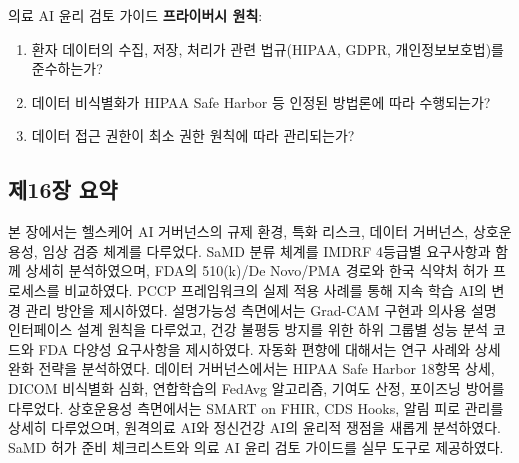 \begin{practicaltool}{의료 AI 윤리 검토 가이드}
\textbf{프라이버시 원칙}:
\begin{enumerate}
 \item 환자 데이터의 수집, 저장, 처리가 관련 법규(HIPAA, GDPR, 개인정보보호법)를 준수하는가?
 \item 데이터 비식별화가 HIPAA Safe Harbor 등 인정된 방법론에 따라 수행되는가?
 \item 데이터 접근 권한이 최소 권한 원칙에 따라 관리되는가?
\end{enumerate}
\end{practicaltool}

\subsection*{제16장 요약}

본 장에서는 헬스케어 AI 거버넌스의 규제 환경, 특화 리스크, 데이터 거버넌스, 상호운용성, 임상 검증 체계를 다루었다. SaMD 분류 체계를 IMDRF 4등급별 요구사항과 함께 상세히 분석하였으며, FDA의 510(k)/De Novo/PMA 경로와 한국 식약처 허가 프로세스를 비교하였다. PCCP 프레임워크의 실제 적용 사례를 통해 지속 학습 AI의 변경 관리 방안을 제시하였다. 설명가능성 측면에서는 Grad-CAM 구현과 의사용 설명 인터페이스 설계 원칙을 다루었고, 건강 불평등 방지를 위한 하위 그룹별 성능 분석 코드와 FDA 다양성 요구사항을 제시하였다. 자동화 편향에 대해서는 연구 사례와 상세 완화 전략을 분석하였다. 데이터 거버넌스에서는 HIPAA Safe Harbor 18항목 상세, DICOM 비식별화 심화, 연합학습의 FedAvg 알고리즘, 기여도 산정, 포이즈닝 방어를 다루었다. 상호운용성 측면에서는 SMART on FHIR, CDS Hooks, 알림 피로 관리를 상세히 다루었으며, 원격의료 AI와 정신건강 AI의 윤리적 쟁점을 새롭게 분석하였다. SaMD 허가 준비 체크리스트와 의료 AI 윤리 검토 가이드를 실무 도구로 제공하였다.

